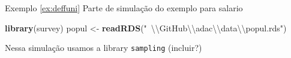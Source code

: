 \documentclass[]{book}
\newenvironment{Shaded}{\begin{snugshade}}{\end{snugshade}}
\newcommand{\KeywordTok}[1]{\textcolor[rgb]{0.13,0.29,0.53}{\textbf{{#1}}}}
\newcommand{\DecValTok}[1]{\textcolor[rgb]{0.00,0.00,0.81}{{#1}}}
\newcommand{\CharTok}[1]{\textcolor[rgb]{0.31,0.60,0.02}{{#1}}}
\newcommand{\StringTok}[1]{\textcolor[rgb]{0.31,0.60,0.02}{{#1}}}
\newcommand{\NormalTok}[1]{{#1}}
\numberwithin{example}{chapter}
\numberwithin{remark}{chapter}
\numberwithin{definition}{chapter}
\begin{document}
Exemplo \ref{ex:deffuni} Parte de simulação do exemplo para salario

\begin{Shaded}
\begin{Highlighting}[]
\KeywordTok{library}\NormalTok{(survey)}
\NormalTok{popul <-}\StringTok{ }\KeywordTok{readRDS}\NormalTok{(}\StringTok{"~}\CharTok{\textbackslash{}\textbackslash{}}\StringTok{GitHub}\CharTok{\textbackslash{}\textbackslash{}}\StringTok{adac}\CharTok{\textbackslash{}\textbackslash{}}\StringTok{data}\CharTok{\textbackslash{}\textbackslash{}}\StringTok{popul.rds"}\NormalTok{)}
\end{Highlighting}
\end{Shaded}

\begin{Shaded}
\end{Shaded}

Nessa simulação usamos a library \texttt{sampling} \citep{R-sampling}
(incluir?)
\end{document}
